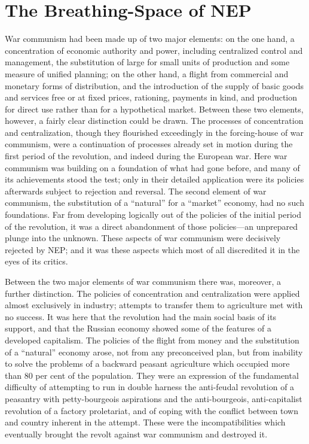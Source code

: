 \chapter{The Breathing-Space of NEP}

War communism had been made up of two major elements: on the one hand, a concentration of economic authority and power, including centralized control and management, the substitution of large for small units of production and some measure of unified planning; on the other hand, a flight from commercial and monetary forms of distribution, and the introduction of the supply of basic goods and services free or at fixed prices, rationing, payments in kind, and production for direct use rather than for a hypothetical market. Between these two elements, however, a fairly clear distinction could be drawn. The processes of concentration and centralization, though they flourished exceedingly in the forcing-house of war communism, were a continuation of processes already set in motion during the first period of the revolution, and indeed during the European war. Here war communism was building on a foundation of what had gone before, and many of its achievements stood the test; only in their detailed application were its policies afterwards subject to rejection and reversal. The second element of war communism, the substitution of a ``natural'' for a ``market'' economy, had no such foundations. Far from developing logically out of the policies of the initial period of the revolution, it was a direct abandonment of those policies---an unprepared plunge into the unknown. These aspects of war communism were decisively rejected by NEP; and it was these aspects which most of all discredited it in the eyes of its critics. 

Between the two major elements of war communism there was, moreover, a further distinction. The policies of concentration and centralization were applied almost exclusively in industry; attempts to transfer them to agriculture met with no success. It was here that the revolution had the main social basis of its support, and that the Russian economy showed some of the features of a developed capitalism. The policies of the flight from money and the substitution of a ``natural'' economy arose, not from any preconceived plan, but from inability to solve the problems of a backward peasant agriculture which occupied more than 80 per cent of the population. They were an expression of the fundamental difficulty of attempting to run in double harness the anti-feudal revolution of a peasantry with petty-bourgeois aspirations and the anti-bourgeois, anti-capitalist revolution of a factory proletariat, and of coping with the conflict between town and country inherent in the attempt. These were the incompatibilities which eventually brought the revolt against war communism and destroyed it. 

